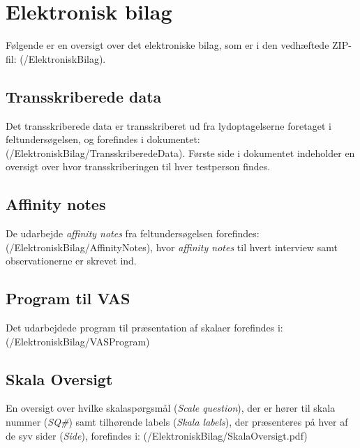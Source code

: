 
\chapter{Elektronisk bilag}
\label{ElektroniskBilagOversigt}
%
Følgende er en oversigt over det elektroniske bilag, som er i den vedhæftede ZIP-fil: (/ElektroniskBilag).

\section{Transskriberede data}
\label{ElektroniskBilagTranskriberede}
%
Det transskriberede data er transskriberet ud fra lydoptagelserne foretaget i feltundersøgelsen, og forefindes i dokumentet: (/ElektroniskBilag/TransskriberedeData). Første side i dokumentet indeholder en oversigt over hvor transskriberingen til hver testperson findes. 

\section{Affinity notes}
\label{ElektroniskBilagAffinityNotes}
%
De udarbejde \textit{affinity notes} fra feltundersøgelsen forefindes: (/ElektroniskBilag/AffinityNotes), hvor \textit{affinity notes} til hvert interview samt observationerne er skrevet ind. 

\section{Program til VAS}
\label{ElektroniskBilagProgram}
%
Det udarbejdede program til præsentation af skalaer forefindes i: (/ElektroniskBilag/VASProgram)

\section{Skala Oversigt}
\label{ElektroniskBilagSkalaOversigt}
%
En oversigt over hvilke skalaspørgsmål (\textit{Scale question}), der er hører til skala nummer (\textit{SQ\#}) samt tilhørende labels (\textit{Skala labels}), der præsenteres på hver af de syv sider (\textit{Side}), forefindes i: (/ElektroniskBilag/SkalaOversigt.pdf)

